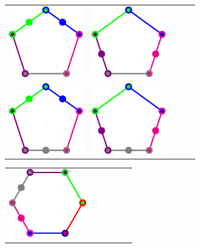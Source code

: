 \documentclass[%
 twocolumn,
 groupedaddress,
 showpacs,
 showkeys,
 preprintnumbers,
 amsmath,amssymb,
 aps,
 pra,
 longbibliography,
 floatfix,
 ]{revtex4-1}
\begin{document}

\begin{figure}
	\begin{center}
		\setlength{\tabcolsep}{1em}
		\begin{tabular}{ccccc}
			\includegraphics{2018-minimalYIYS_pra_15REVISEDJR-Fig2a.pdf}
			&
			\includegraphics{2018-minimalYIYS_pra_15REVISEDJR-Fig2b.pdf}
			\\
			\includegraphics{2018-minimalYIYS_pra_15REVISEDJR-Fig2c.pdf}
			&
			\includegraphics{2018-minimalYIYS_pra_15REVISEDJR-Fig2d.pdf}
			\\
		\end{tabular}
		\begin{tabular}{cccccc}
			\includegraphics{2018-minimalYIYS_pra_15REVISEDJR-Fig2e.pdf}

\end{tabular}
\end{center}
\end{figure}
\end{document}
